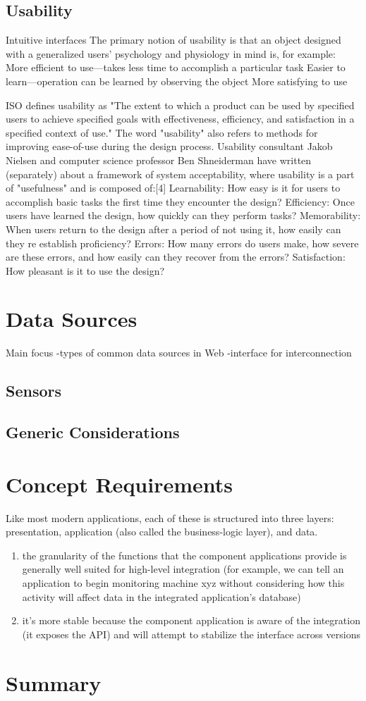 \subsection {Usability} Intuitive interfaces
The primary notion of usability is that an object designed with a generalized users' psychology and physiology in mind is, for example:
More efficient to use—takes less time to accomplish a particular task
Easier to learn—operation can be learned by observing the object
More satisfying to use

ISO defines usability as "The extent to which a product can be used by specified users to achieve specified goals with effectiveness, efficiency, and satisfaction in a specified context of use." The word "usability" also refers to methods for improving ease-of-use during the design process. Usability consultant Jakob Nielsen and computer science professor Ben Shneiderman have written (separately) about a framework of system acceptability, where usability is a part of "usefulness" and is composed of:[4]
Learnability: How easy is it for users to accomplish basic tasks the first time they encounter the design?
Efficiency: Once users have learned the design, how quickly can they perform tasks?
Memorability: When users return to the design after a period of not using it, how easily can they re establish proficiency?
Errors: How many errors do users make, how severe are these errors, and how easily can they recover from the errors?
Satisfaction: How pleasant is it to use the design?
\section {Data Sources}
Main focus 
-types of common data sources in Web
\newline
-interface for interconnection
\subsection {Sensors}

\subsection {Generic Considerations}

\section{Concept Requirements}
Like most modern applications, each of these is structured into three layers: presentation, 
application (also called the business-logic layer), and data.
\begin{enumerate}
\item the granularity of the functions that the component applications provide is generally well
suited for high-level integration (for example, we can tell an application to begin monitoring
machine xyz without considering how this activity will affect data in the integrated application’s database)
\item it’s more stable because the component application is aware of the integration (it exposes
the API) and will attempt to stabilize the interface across versions
\end{enumerate}

\section{Summary}